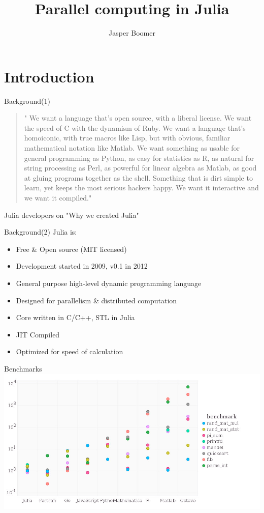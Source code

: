 \documentclass{beamer}
\title{Parallel computing in Julia}
\author{Jasper Boomer}
\begin{document}
	\frame{\titlepage}
	\section{Introduction}
	\begin{frame}{Background(1)}
		\begin{quote}
			" We want a language that’s open source, with a liberal license. We want the speed of C with the dynamism of Ruby. We want a language that’s homoiconic, with true macros like Lisp, but with obvious, familiar mathematical notation like Matlab. We want something as usable for general programming as Python, as easy for statistics as R, as natural for string processing as Perl, as powerful for linear algebra as Matlab, as good at gluing programs together as the shell. Something that is dirt simple to learn, yet keeps the most serious hackers happy. We want it interactive and we want it compiled."
		\end{quote}
		 Julia developers on "Why we created Julia"
	\end{frame}


	\begin{frame}{Background(2)}
		Julia is: 
		\begin{itemize}
			\item{Free \& Open source (MIT licensed)}
			\item{Development started in 2009, v0.1 in 2012}
			\item{General purpose high-level dynamic programming language}
			\item{Designed for parallelism \& distributed computation}
			\item{Core written in C/C++, STL in Julia}
			\item{JIT Compiled}
			\item{Optimized for speed of calculation}
		\end{itemize}
	\end{frame}
	
	\begin{frame}{Benchmarks}
		\includegraphics[width=\textwidth]{figures/benchmarks.jpg}
	\end{frame}
\end{document}
